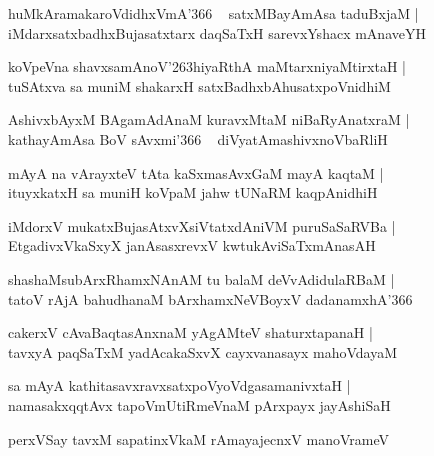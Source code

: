 \documentclass[twoside,12pt,openright]{book}
\def\S{\char'263}
\newcounter{shloka}[chapter]
\begin{document}
\begin{shloka}%
huMkAramakaroVdidhxVmA\char'366 ~ satxMBayAmAsa taduBxjaM |\\
iMdarxsatxbadhxBujasatxtarx daqSaTxH sarevxYshacx mAnaveYH 
\end{shloka}

\begin{shloka}%
koVpeVna shavxsamAnoV\S hiyaRthA maMtarxniyaMtirxtaH |\\
tuSAtxva sa muniM shakarxH satxBadhxbAhusatxpoVnidhiM 
\end{shloka}

\begin{shloka}%
AshivxbAyxM BAgamAdAnaM kuravxMtaM niBaRyAnatxraM |\\
kathayAmAsa BoV sAvxmi\char'366 ~ diVyatAmashivxnoVbaRliH 
\end{shloka}

\begin{shloka}%
mAyA na vArayxteV tAta kaSxmasAvxGaM mayA kaqtaM |\\
ituyxkatxH sa muniH koVpaM jahw tUNaRM kaqpAnidhiH 
\end{shloka}

\begin{shloka}%
iMdorxV mukatxBujasAtxvXsiVtatxdAniVM puruSaSaRVBa |\\
EtgadivxVkaSxyX janAsasxrevxV kwtukAviSaTxmAnasAH
\end{shloka}

\begin{shloka}%
shashaMsubArxRhamxNAnAM tu balaM deVvAdidulaRBaM |\\
tatoV rAjA bahudhanaM bArxhamxNeVBoyxV dadanamxhA\char'366
\end{shloka}

\begin{shloka}%
cakerxV cAvaBaqtasAnxnaM yAgAMteV shaturxtapanaH |\\
tavxyA paqSaTxM yadAcakaSxvX cayxvanasayx mahoVdayaM
\end{shloka}

\begin{shloka}%
sa mAyA kathitasavxravxsatxpoVyoVdgasamanivxtaH |\\
namasakxqqtAvx tapoVmUtiRmeVnaM pArxpayx jayAshiSaH
\end{shloka}

\begin{shloka}%
perxVSay tavxM sapatinxVkaM rAmayajecnxV manoVrameV
\end{shloka}
\end{document}
